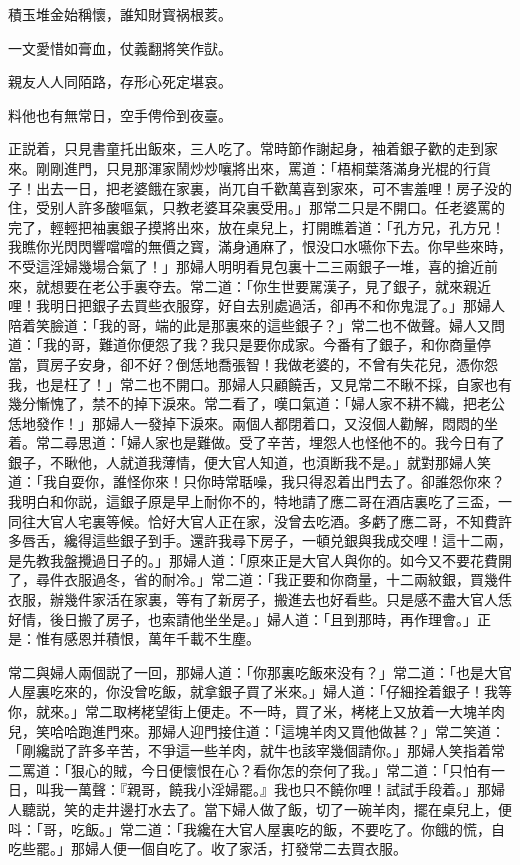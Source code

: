 \begin{myquote}
積玉堆金始稱懷，誰知財寳祸根荄。

一文愛惜如膏血，仗義翻將笑作獃。

親友人人同陌路，存形心死定堪哀。

料他也有無常日，空手俜伶到夜臺。
\end{myquote}

正説着，只見書童托出飯來，三人吃了。常時節作謝起身，袖着銀子歡的走到家來。剛剛進門，只見那渾家鬧炒炒嚷將出來，罵道：「梧桐葉落滿身光棍的行貨子！出去一日，把老婆餓在家裏，尚兀自千歡萬喜到家來，可不害羞哩！房子没的住，受别人許多酸嘔氣，只教老婆耳朶裏受用。」那常二只是不開口。任老婆罵的完了，輕輕把袖裏銀子摸將出來，放在桌兒上，打開瞧着道：「孔方兄，孔方兄！我瞧你光閃閃響噹噹的無價之寳，滿身通麻了，恨没口水嚥你下去。你早些來時，不受這淫婦幾場合氣了！」那婦人明明看見包裏十二三兩銀子一堆，喜的搶近前來，就想要在老公手裏夺去。常二道：「你生世要駡漢子，見了銀子，就來親近哩！我明日把銀子去買些衣服穿，好自去别處過活，卻再不和你鬼混了。」那婦人陪着笑臉道：「我的哥，端的此是那裏來的這些銀子？」常二也不做聲。婦人又問道：「我的哥，難道你便怨了我？我只是要你成家。今番有了銀子，和你商量停當，買房子安身，卻不好？倒恁地喬張智！我做老婆的，不曾有失花兒，憑你怨我，也是枉了！」常二也不開口。那婦人只顧饒舌，又見常二不瞅不採，自家也有幾分慚愧了，禁不的掉下淚來。常二看了，嘆口氣道：「婦人家不耕不織，把老公恁地發作！」那婦人一發掉下淚來。兩個人都閉着口，又沒個人勸解，悶悶的坐着。常二尋思道：「婦人家也是難做。受了辛苦，埋怨人也怪他不的。我今日有了銀子，不瞅他，人就道我薄情，便大官人知道，也湏断我不是。」就對那婦人笑道：「我自耍你，誰怪你來！只你時常聒噪，我只得忍着出門去了。卻誰怨你來？我明白和你説，這銀子原是早上耐你不的，特地請了應二哥在酒店裏吃了三盃，一同往大官人宅裏等候。恰好大官人正在家，没曾去吃酒。多虧了應二哥，不知費許多唇舌，纔得這些銀子到手。還許我尋下房子，一頓兑銀與我成交哩！這十二兩，是先教我盤攪過日子的。」那婦人道：「原來正是大官人與你的。如今又不要花費開了，尋件衣服過冬，省的耐冷。」常二道：「我正要和你商量，十二兩紋銀，買幾件衣服，辦幾件家活在家裏，等有了新房子，搬進去也好看些。只是感不盡大官人恁好情，後日搬了房子，也索請他坐坐是。」婦人道：「且到那時，再作理會。」正是：惟有感恩并積恨，萬年千載不生塵。

常二與婦人兩個説了一回，那婦人道：「你那裏吃飯來没有？」常二道：「也是大官人屋裏吃來的，你没曾吃飯，就拿銀子買了米來。」婦人道：「仔細拴着銀子！我等你，就來。」常二取栲栳望街上便走。不一時，買了米，栲栳上又放着一大塊羊肉兒，笑哈哈跑進門來。那婦人迎門接住道：「這塊羊肉又買他做甚？」常二笑道：「剛纔説了許多辛苦，不爭這一些羊肉，就牛也該宰幾個請你。」那婦人笑指着常二罵道：「狠心的賊，今日便懷恨在心？看你怎的奈何了我。」常二道：「只怕有一日，叫我一萬聲：『親哥，饒我小淫婦罷。』我也只不饒你哩！試試手段着。」那婦人聽説，笑的走井邊打水去了。當下婦人做了飯，切了一碗羊肉，擺在桌兒上，便呌：「哥，吃飯。」常二道：「我纔在大官人屋裏吃的飯，不要吃了。你餓的慌，自吃些罷。」那婦人便一個自吃了。收了家活，打發常二去買衣服。

